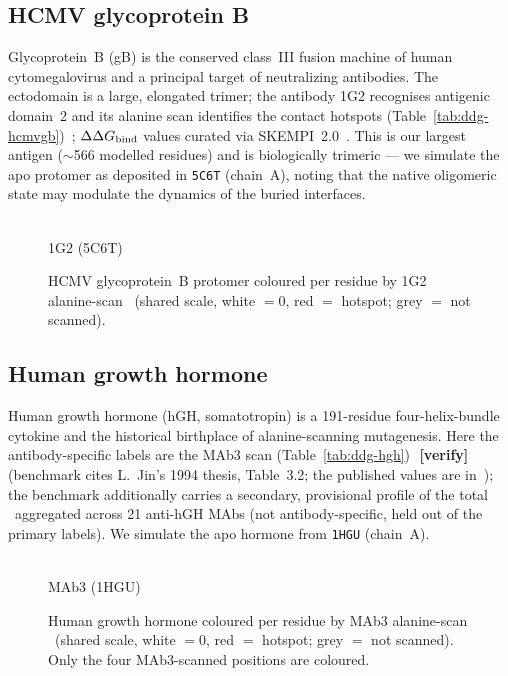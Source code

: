 \subsection{HCMV glycoprotein B}
Glycoprotein~B (gB) is the conserved class~III fusion machine of human cytomegalovirus and a
principal target of neutralizing antibodies. The ectodomain is a large, elongated trimer; the
antibody 1G2 recognises antigenic domain~2 and its alanine scan identifies the contact hotspots
(Table~\ref{tab:ddg-hcmvgb})~\cite{chandramouli2015}; $\Delta\Delta G_{\mathrm{bind}}$ values curated via
SKEMPI~2.0~\cite{skempi2}. This is our largest antigen ($\sim$566 modelled residues) and is
biologically trimeric --- we simulate the apo protomer as deposited in \texttt{5C6T} (chain~A),
noting that the native oligomeric state may modulate the dynamics of the buried interfaces.
\begin{figure}[H]\centering
\begin{minipage}[c]{0.6\linewidth}\centering{}\\[-2pt]{\small 1G2 (5C6T)}\end{minipage}\hfill
\begin{minipage}[c]{0.13\linewidth}\centering{}\end{minipage}
\caption{HCMV glycoprotein~B protomer coloured per residue by 1G2 alanine-scan \ddG\ (shared scale, white $=0$, red $=$ hotspot; grey $=$ not scanned).}\end{figure}


\subsection{Human growth hormone}
Human growth hormone (hGH, somatotropin) is a 191-residue four-helix-bundle cytokine and the
historical birthplace of alanine-scanning mutagenesis. Here the antibody-specific labels are the
MAb3 scan (Table~\ref{tab:ddg-hgh})~\cite{jin1992}\,\textbf{[verify]} (benchmark cites L.\ Jin's
1994 thesis, Table~3.2; the published values are in~\cite{jin1992}); the benchmark additionally
carries a secondary,
provisional profile of the total \ddG\ aggregated across 21 anti-hGH MAbs (not antibody-specific,
held out of the primary labels). We simulate the apo hormone from \texttt{1HGU} (chain~A).
\begin{figure}[H]\centering
\begin{minipage}[c]{0.6\linewidth}\centering{}\\[-2pt]{\small MAb3 (1HGU)}\end{minipage}\hfill
\begin{minipage}[c]{0.13\linewidth}\centering{}\end{minipage}
\caption{Human growth hormone coloured per residue by MAb3 alanine-scan \ddG\ (shared scale, white $=0$, red $=$ hotspot; grey $=$ not scanned). Only the four MAb3-scanned positions are coloured.}\end{figure}

